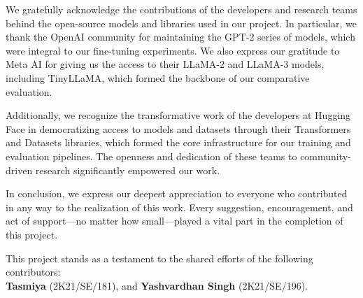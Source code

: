 \begin{doublespace}
  \vspace{1em}
  \noindent
  We gratefully acknowledge the contributions of the developers and research teams behind
  the open-source models and libraries used in our project. In particular, we thank the
  OpenAI community for maintaining the GPT-2 series of models, which were integral to
  our fine-tuning experiments. We also express our gratitude to Meta AI for giving us the
  access to their LLaMA-2 and LLaMA-3 models, including TinyLLaMA, which formed the
  backbone of our comparative evaluation.
  
  \vspace{1em}
  \noindent
  Additionally, we recognize the transformative work of the developers at Hugging Face in
  democratizing access to models and datasets through their Transformers and Datasets
  libraries, which formed the core infrastructure for our training and evaluation pipelines.
  The openness and dedication of these teams to community-driven research significantly
  empowered our work.

  \vspace{1em}
  \noindent
  In conclusion, we express our deepest appreciation to everyone who contributed in any way
  to the realization of this work. Every suggestion, encouragement, and act of support—no
  matter how small—played a vital part in the completion of this project.

  \vspace{1em}
  \noindent
  This project stands as a testament to the shared efforts of the following contributors:\\
  \textbf{Tasmiya} (2K21/SE/181), and \textbf{Yashvardhan Singh} (2K21/SE/196).
\end{doublespace}

\newpage
